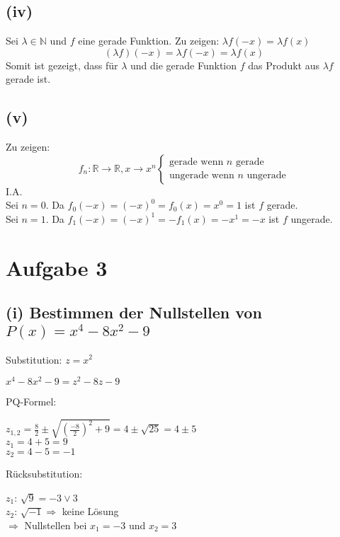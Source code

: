 \documentclass{article}
\begin{document}
\subsection{(iv)}
Sei $\lambda \in \mathbb{N}$ und $f$ eine gerade Funktion. Zu zeigen: $\lambda f(-x) = \lambda f(x)$
\[(\lambda f)(-x) = \lambda f (-x) = \lambda f (x)\]
Somit ist gezeigt, dass für $\lambda$ und die gerade Funktion $f$ das Produkt aus $\lambda f$ gerade ist.

\subsection{(v)}
Zu zeigen: \[f_n: \mathbb{R} \to \mathbb{R}, x \to x^n \begin{cases}
    \text{gerade wenn } n \text{ gerade} \\
    \text{ungerade wenn } n \text{ ungerade}
\end{cases}\]
I.A. \\
Sei $n = 0$. Da $f_0(-x) = (-x)^0 = f_0(x) = x^0 = 1$ ist $f$ gerade. \\
\newline
Sei $n = 1$. Da $f_1(-x) = (-x)^1 = -f_1(x) = -x^1 = -x$ ist $f$ ungerade.

\section{Aufgabe 3}
\subsection{(i) Bestimmen der Nullstellen von $P(x)=x^4-8x^2-9$}
Substitution: $z=x^2$ 
\begin{center}
    $x^4-8x^2-9=z^2-8z-9$
\end{center}
PQ-Formel: 
\begin{center}
    $z_{1,2}=\frac{8}{2} \pm \sqrt{(\frac{-8}{2})^2 + 9} = 4 \pm \sqrt{25} = 4 \pm 5$ \\
    $z_1=4+5=9$ \\
    $z_2=4-5=-1$
\end{center}
Rücksubstitution:
\begin{center}
    $z_1$: $\sqrt{9} = -3 \lor 3$ \\
    $z_2$: $\sqrt{-1} \Longrightarrow$ keine Lösung \\
    $\Longrightarrow$ Nullstellen bei $x_1 = -3$ und $x_2 = 3$
\end{center}
\end{document}
